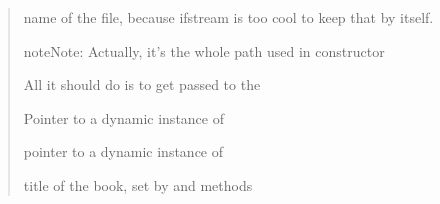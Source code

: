 \documentclass[letterpaper,10pt,english]{sphinxmanual}
\begin{document}
\begin{quote}
\begin{fulllineitems}
\end{fulllineitems}


\begin{fulllineitems}
\label{mobireader:mobireader::input_file_name__string}
name of the file, because ifstream is too cool to keep that by itself.

\begin{notice}{note}{Note:}
Actually, it's the whole path used in constructor
\end{notice}

\end{fulllineitems}


\begin{fulllineitems}
\label{mobireader:mobireader::file__ifstreamP}
All it should do is to get passed to the {\hyperref[mobireader:mobireader::handler__header_handlerP]{}}

\end{fulllineitems}


\begin{fulllineitems}
\label{mobireader:mobireader::reader__compressionP}
Pointer to a dynamic instance of {\hyperref[compression:mobi::compression]{}}

\end{fulllineitems}


\begin{fulllineitems}
\label{mobireader:mobireader::handler__header_handlerP}
pointer to a dynamic instance of {\hyperref[header_handler:header_handler]{}}

\end{fulllineitems}


\begin{fulllineitems}
\label{mobireader:mobireader::title__cP}
title of the book,
set by
{\hyperref[mobireader:mobireader::set_title__cCP]{}} and {\hyperref[mobireader:set_default_title]{}} methods

\end{fulllineitems}

\end{quote}
\end{document}
